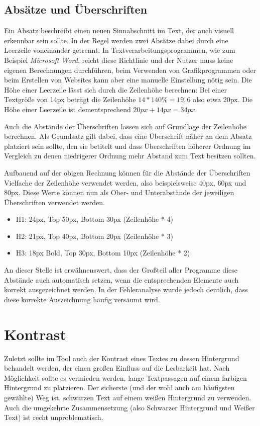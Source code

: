 \subsection{Absätze und Überschriften}
Ein Absatz beschreibt einen neuen Sinnabschnitt im Text, der auch visuell erkennbar sein sollte. In der Regel werden zwei Absätze dabei durch eine Leerzeile voneinander getrennt. In Textverarbeitungsprogrammen, wie zum Beispiel \textit{Microsoft Word}, reicht diese Richtlinie und der Nutzer muss keine eigenen Berechnungen durchführen, beim Verwenden von Grafikprogrammen oder beim Erstellen von Websites kann aber eine manuelle Einstellung nötig sein. Die Höhe einer Leerzeile lässt sich durch die Zeilenhöhe berechnen: Bei einer Textgröße von 14px beträgt die Zeilenhöhe \(14 * 140\% = 19,6\) also etwa 20px. Die Höhe einer Leerzeile ist dementsprechend \(20px + 14px = 34px\).

Auch die Abstände der Überschriften lassen sich auf Grundlage der Zeilenhöhe berechnen. Als Grundsatz gilt dabei, dass eine Überschrift näher an dem Absatz platziert sein sollte, den sie betitelt und dass Überschriften höherer Ordnung im Vergleich zu denen niedrigerer Ordnung mehr Abstand zum Text besitzen sollten.

Aufbauend auf der obigen Rechnung können für die Abstände der Überschriften Vielfache der Zeilenhöhe verwendet werden, also beispielsweise 40px, 60px und 80px. Diese Werte können nun als Ober- und Unterabstände der jeweiligen Überschriften verwendet werden.

\begin{itemize}
	\item H1: 24px, Top 50px, Bottom 30px (Zeilenhöhe * 4)
	\item H2: 21px, Top 40px, Bottom 20px (Zeilenhöhe * 3)
	\item H3: 18px Bold, Top 30px, Bottom 10px (Zeilenhöhe * 2)
\end{itemize}

An dieser Stelle ist erwähnenswert, dass der Großteil aller Programme diese Abstände auch automatisch setzen, wenn die entsprechenden Elemente auch korrekt ausgezeichnet werden. In der Fehleranalyse wurde jedoch deutlich, dass diese korrekte Auszeichnung häufig versäumt wird.


\section{Kontrast}
Zuletzt sollte im Tool auch der Kontrast eines Textes zu dessen Hintergrund behandelt werden, der einen großen Einfluss auf die Lesbarkeit hat.
Nach Möglichkeit sollte es vermieden werden, lange Textpassagen auf einem farbigen Hintergrund zu platzieren.
Der sicherste (und der wohl auch am häufigsten gewählte) Weg ist, schwarzen Text auf einem weißen Hintergrund zu verwenden. Auch die umgekehrte Zusammensetzung (also Schwarzer Hintergrund und Weißer Text) ist recht unproblematisch.

